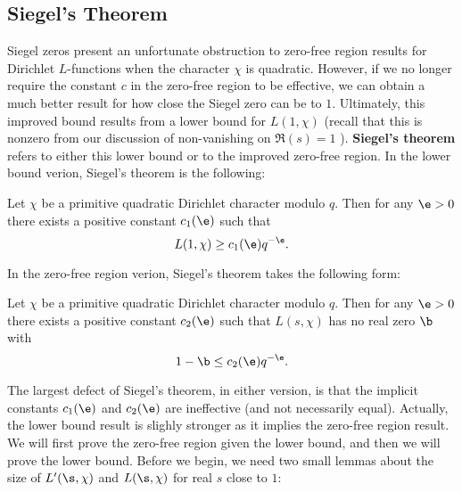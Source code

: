    \subsection*{Siegel's Theorem}
      Siegel zeros present an unfortunate obstruction to zero-free region results for Dirichlet $L$-functions when the character $\chi$ is quadratic. However, if we no longer require the constant $c$ in the zero-free region to be effective, we can obtain a much better result for how close the Siegel zero can be to $1$. Ultimately, this improved bound results from a lower bound for $L(1,\chi)$ (recall that this is nonzero from our discussion of non-vanishing on $\Re(s) = 1$ ). \textbf{Siegel's theorem} refers to either this lower bound or to the improved zero-free region. In the lower bound verion, Siegel's theorem is the following:

      \begin{theorem}
        Let $\chi$ be a primitive quadratic Dirichlet character modulo $q$. Then for any $\e > 0$ there exists a positive constant $c_{1}(\e)$ such that
        \[
          L(1,\chi) \ge c_{1}(\e)q^{-\e}.
        \]
      \end{theorem}

      In the zero-free region verion, Siegel's theorem takes the following form:

      \begin{theorem}
        Let $\chi$ be a primitive quadratic Dirichlet character modulo $q$. Then for any $\e > 0$ there exists a positive constant $c_{2}(\e)$ such that $L(s,\chi)$ has no real zero $\b$ with
        \[
          1-\b \le c_{2}(\e)q^{-\e}.
        \]
      \end{theorem}

      The largest defect of Siegel's theorem, in either version, is that the implicit constants $c_{1}(\e)$ and $c_{2}(\e)$ are ineffective (and not necessarily equal). Actually, the lower bound result is slighly stronger as it implies the zero-free region result. We will first prove the zero-free region given the lower bound, and then we will prove the lower bound. Before we begin, we need two small lemmas about the size of $L'(\s,\chi)$ and $L(\s,\chi)$ for real $s$ close to $1$:

